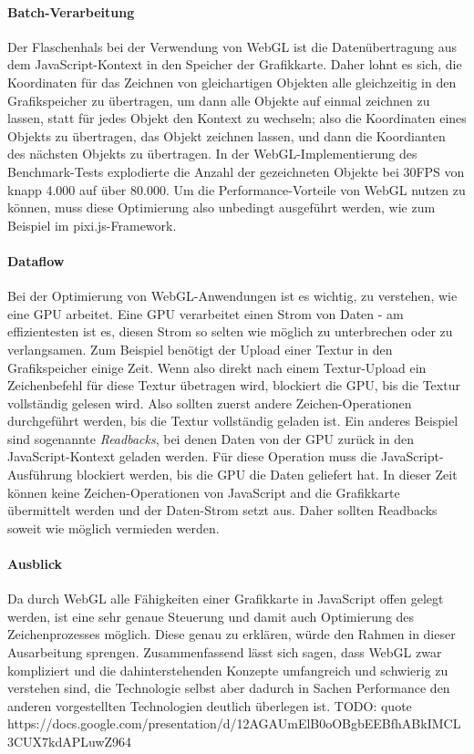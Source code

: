 \documentclass[a4paper, 12pt]{article}
\begin{document}
\paragraph{Batch-Verarbeitung} Der Flaschenhals bei der Verwendung von WebGL ist die Datenübertragung aus dem JavaScript-Kontext in den Speicher der Grafikkarte. Daher lohnt es sich, die Koordinaten für das Zeichnen von gleichartigen Objekten alle gleichzeitig in den Grafikspeicher zu übertragen, um dann alle Objekte auf einmal zeichnen zu lassen, statt für jedes Objekt den Kontext zu wechseln; also die Koordinaten eines Objekts zu übertragen, das Objekt zeichnen lassen, und dann die Koordianten des nächsten Objekts zu übertragen. In der WebGL-Implementierung des Benchmark-Tests explodierte die Anzahl der gezeichneten Objekte bei 30FPS von knapp 4.000 auf über 80.000. Um die Performance-Vorteile von WebGL nutzen zu können, muss diese Optimierung also unbedingt ausgeführt werden, wie zum Beispiel im pixi.js-Framework.
\paragraph{Dataflow} Bei der Optimierung von WebGL-Anwendungen ist es wichtig, zu verstehen, wie eine GPU arbeitet. Eine GPU verarbeitet einen Strom von Daten - am effizientesten ist es, diesen Strom so selten wie möglich zu unterbrechen oder zu verlangsamen. Zum Beispiel benötigt der Upload einer Textur in den Grafikspeicher einige Zeit. Wenn also direkt nach einem Textur-Upload ein Zeichenbefehl für diese Textur übetragen wird, blockiert die GPU, bis die Textur vollständig gelesen wird. Also sollten zuerst andere Zeichen-Operationen durchgeführt werden, bis die Textur vollständig geladen ist. Ein anderes Beispiel sind sogenannte \emph{Readbacks}, bei denen Daten von der GPU zurück in den JavaScript-Kontext geladen werden. Für diese Operation muss die JavaScript-Ausführung blockiert werden, bis die GPU die Daten geliefert hat. In dieser Zeit können keine Zeichen-Operationen von JavaScript and die Grafikkarte übermittelt werden und der Daten-Strom setzt aus. Daher sollten Readbacks soweit wie möglich vermieden werden.
\paragraph{Ausblick} Da durch WebGL alle Fähigkeiten einer Grafikkarte in JavaScript offen gelegt werden, ist eine sehr genaue Steuerung und damit auch Optimierung des Zeichenprozesses möglich. Diese genau zu erklären, würde den Rahmen in dieser Ausarbeitung sprengen. Zusammenfassend lässt sich sagen, dass WebGL zwar kompliziert und die dahinterstehenden Konzepte umfangreich und schwierig zu verstehen sind, die Technologie selbst aber dadurch in Sachen Performance den anderen vorgestellten Technologien deutlich überlegen ist. 
TODO: quote https://docs.google.com/presentation/d/12AGAUmElB0oOBgbEEBfhABkIMCL3CUX7kdAPLuwZ964
\end{document}
